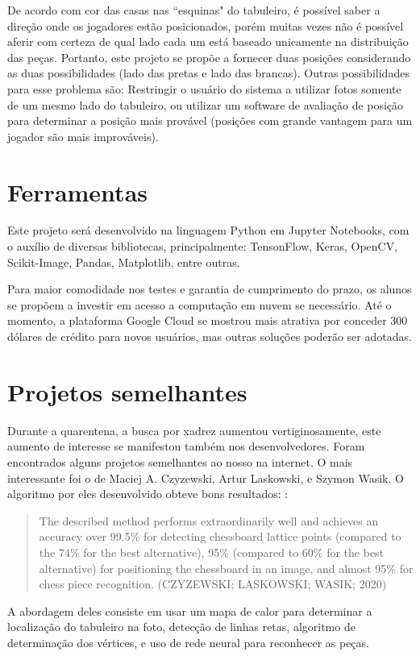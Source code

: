\documentclass[a4paper,12pt,twoside]{article}
\begin{document}
De acordo com cor das casas nas ``esquinas" do tabuleiro,
é possível saber a direção onde os jogadores estão posicionados,
porém muitas vezes não é possível aferir com certeza de qual lado cada um está baseado unicamente na distribuição das peças.
Portanto, este projeto se propõe a fornecer duas posições considerando as duas possibilidades
(lado das pretas e lado das brancas).
Outras possibilidades para esse problema são:
Restringir o usuário do sistema a utilizar fotos somente de um mesmo lado do tabuleiro,
ou utilizar um software de avaliação de posição para determinar a posição mais provável
(posições com grande vantagem para um jogador são mais improváveis).

\section{Ferramentas}
Este projeto será desenvolvido na linguagem Python em Jupyter Notebooks,
com o auxílio de diversas bibliotecas, principalmente:
TensonFlow, Keras, OpenCV, Scikit-Image, Pandas, Matplotlib, entre outras.

Para maior comodidade nos testes e garantia de cumprimento do prazo,
os alunos se propõem a investir em acesso a computação em nuvem se necessário.
Até o momento, a plataforma Google Cloud se mostrou mais atrativa por conceder 300 dólares de crédito para novos usuários,
mas outras soluções poderão ser adotadas.

\section{Projetos semelhantes}
Durante a quarentena, a busca por xadrez aumentou vertiginosamente,
este aumento de interesse se manifestou também nos desenvolvedores.
Foram encontrados alguns projetos semelhantes ao nosso na internet.
O mais interessante foi o de Maciej A. Czyzewski, Artur Laskowski, e Szymon Wasik.
O algoritmo por eles desenvolvido obteve bons resultados:
\cite{czy20}:
\blockquote{The described method performs extraordinarily well and achieves an accuracy over
            99.5\% for detecting chessboard lattice points (compared to the 74\% for the best alternative),
            95\% (compared to 60\% for the best alternative) for positioning the chessboard in an image, and almost
            95\% for chess piece recognition. (CZYZEWSKI; LASKOWSKI; WASIK; 2020)}

A abordagem deles consiste em usar um mapa de calor para determinar a localização do tabuleiro na foto,
detecção de linhas retas, algoritmo de determinação dos vértices, e uso de rede neural para reconhecer as peças.
\end{document}
